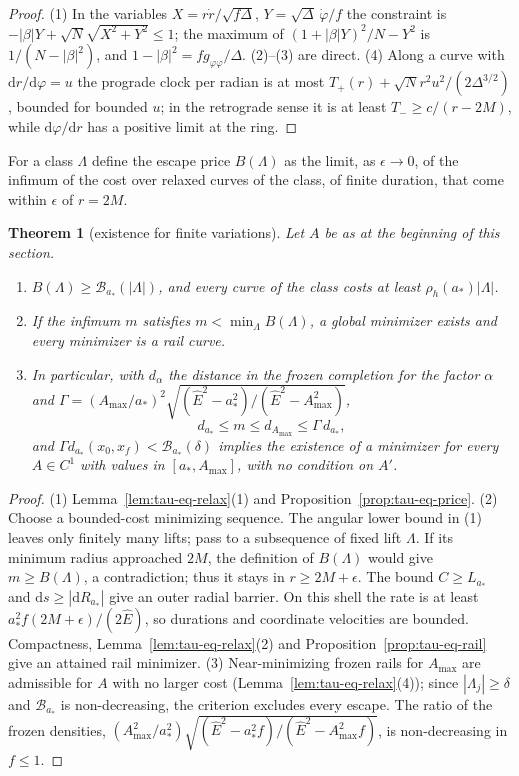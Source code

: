 \documentclass[aip,jmp,amsmath,amssymb,reprint]{revtex4-2}
\newcommand{\Ehat}{\hat E}
\newcommand{\dd}{\mathrm{d}}
\theoremstyle{plain}
\newtheorem{theorem}{Theorem}
\theoremstyle{definition}
\begin{document}
\begin{proof}
(1) In the variables $X=r\dot r/\sqrt{f\Delta}$, $Y=\sqrt\Delta\,\dot\varphi/f$ the constraint is
$-|\beta|Y+\sqrt N\sqrt{X^2+Y^2}\le1$; the maximum of $(1+|\beta|Y)^2/N-Y^2$ is $1/(N-|\beta|^2)$, and
$1-|\beta|^2=fg_{\varphi\varphi}/\Delta$. (2)--(3) are direct. (4) Along a curve with $\dd r/\dd\varphi=u$ the
prograde clock per radian is at most $T_+(r)+\sqrt N r^2u^2/(2\Delta^{3/2})$, bounded for bounded
$u$; in the retrograde sense it is at least $T_-\ge c/(r-2M)$, while $\dd\varphi/\dd r$ has a positive
limit at the ring.
\end{proof}

For a class $\Lambda$ define the escape price $B(\Lambda)$ as the limit, as $\epsilon\to0$, of the infimum of
the cost over relaxed curves of the class, of finite duration, that come within $\epsilon$ of $r=2M$.

\begin{theorem}[existence for finite variations]\label{thm:tau-eq-exist}
Let $A$ be as at the beginning of this section.
\begin{enumerate}
\item $B(\Lambda)\ge\mathcal B_{a_*}(|\Lambda|)$, and every curve of the class costs at least $\rho_h(a_*)|\Lambda|$.
\item If the infimum $m$ satisfies $m<\min_\Lambda B(\Lambda)$, a global minimizer exists and every minimizer
  is a rail curve.
\item In particular, with $d_\alpha$ the distance in the frozen completion for the factor $\alpha$ and
  $\Gamma=(A_{\max}/a_*)^2\sqrt{(\Ehat^2-a_*^2)/(\Ehat^2-A_{\max}^2)}$,
  \[
    d_{a_*}\le m\le d_{A_{\max}}\le\Gamma\,d_{a_*},
  \]
  and $\Gamma d_{a_*}(x_0,x_f)<\mathcal B_{a_*}(\delta)$ implies the existence of a minimizer for every
  $A\in C^1$ with values in $[a_*,A_{\max}]$, with no condition on $A'$.
\end{enumerate}
\end{theorem}

\begin{proof}
(1) Lemma~\ref{lem:tau-eq-relax}(1) and Proposition~\ref{prop:tau-eq-price}. (2) Choose a bounded-cost minimizing sequence. The angular lower bound in (1) leaves only finitely
many lifts; pass to a subsequence of fixed lift $\Lambda$. If its minimum radius approached $2M$, the
definition of $B(\Lambda)$ would give $m\ge B(\Lambda)$, a contradiction; thus it stays in
$r\ge2M+\epsilon$. The bound $C\ge L_{a_*}$ and $\dd s\ge|\dd R_{a_*}|$ give an outer radial barrier. On this
shell the rate is at least $a_*^2f(2M+\epsilon)/(2\Ehat)$, so durations and coordinate velocities are
bounded. Compactness, Lemma~\ref{lem:tau-eq-relax}(2) and Proposition~\ref{prop:tau-eq-rail} give
an attained rail minimizer. (3) Near-minimizing frozen rails for $A_{\max}$ are admissible for $A$ with no larger cost
(Lemma~\ref{lem:tau-eq-relax}(4)); since $|\Lambda_j|\ge\delta$ and $\mathcal B_{a_*}$ is non-decreasing, the
criterion excludes every escape. The ratio of the frozen densities,
$(A_{\max}^2/a_*^2)\sqrt{(\Ehat^2-a_*^2f)/(\Ehat^2-A_{\max}^2f)}$, is non-decreasing in $f\le1$.
\end{proof}
\end{document}
